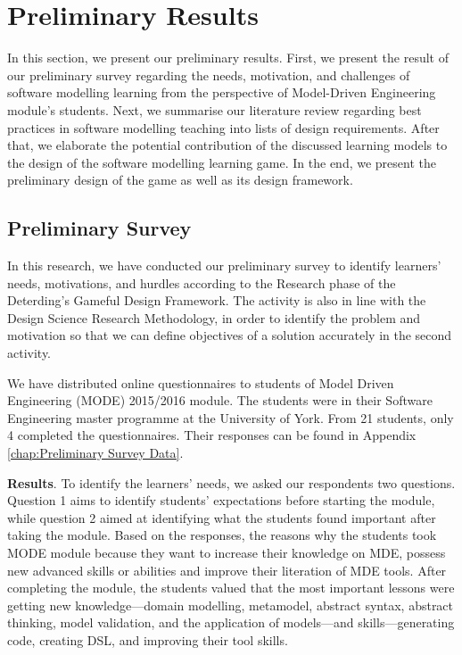 \documentclass[12pt, a4paper]{report}
\begin{document}
\chapter{Preliminary Results}
In this section, we present our preliminary results. First, we present the result of our preliminary survey regarding the needs, motivation, and challenges of software modelling learning from the perspective of Model-Driven Engineering module's students. Next, we summarise our literature review regarding best practices in software modelling teaching into lists of design requirements. After that, we elaborate the potential contribution of the discussed learning models to the design of the software modelling learning game. In the end, we present the preliminary design of the game as well as  its design framework. 

\section{Preliminary Survey}
\label{Preliminary Survey}
In this research, we have conducted our preliminary survey to identify learners' needs, motivations, and hurdles according to the Research phase of the Deterding's Gameful Design Framework. The activity is also in line with the Design Science Research Methodology, in order to identify the problem and motivation so that we can define objectives of a solution accurately in the second activity. 

We have distributed online questionnaires to students of Model Driven Engineering (MODE) 2015/2016 module. The students were in their Software Engineering master programme at the University of York. From 21 students, only 4 completed the questionnaires. Their responses can be found in Appendix \autoref{chap:Preliminary Survey Data}.

\textbf{Results}. To identify the learners' needs, we asked our respondents two questions. Question 1 aims to identify students' expectations before starting the module, while question 2 aimed at identifying what the students found important after taking the module. Based on the responses, the reasons why the students took MODE module because they want to increase their knowledge on MDE, possess new advanced skills or abilities and improve their literation of MDE tools. After completing the module, the students valued that the most important lessons were getting new knowledge---domain modelling, metamodel, abstract syntax, abstract thinking, model validation, and the application of models---and skills---generating code, creating DSL, and improving their tool skills. 
\end{document}
